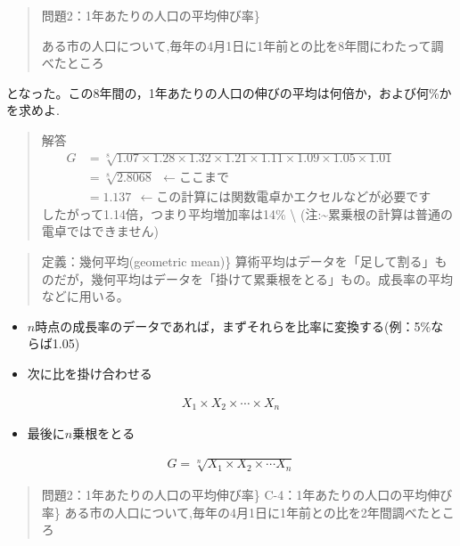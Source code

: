 \documentclass[
]{book}
\providecommand{\tightlist}{%
  \setlength{\itemsep}{0pt}\setlength{\parskip}{0pt}}
\theoremstyle{definition}
\theoremstyle{definition}
\theoremstyle{definition}
\theoremstyle{definition}
\theoremstyle{remark}
\begin{document}
\begin{quote}
問題2：1年あたりの人口の平均伸び率\}

ある市の人口について,毎年の4月1日に1年前との比を8年間にわたって調べたところ
\end{quote}

となった。この8年間の，1年あたりの人口の伸びの平均は何倍か，および何\%かを求めよ.

\begin{quote}
解答
\begin{align*}
G
&=\sqrt[8]{1.07 \times 1.28 \times 1.32 \times 1.21 \times 1.11 \times 1.09 \times 1.05 \times 1.01} \\
&=\sqrt[8]{2.8068}~~\leftarrow \text{ここまで} \\
&=1.137~~\leftarrow \text{この計算には関数電卓かエクセルなどが必要です} 
\end{align*}
したがって1.14倍，つまり平均増加率は14\% \textbackslash{}
(注:\textasciitilde 累乗根の計算は普通の電卓ではできません)
\end{quote}

\begin{quote}
定義：幾何平均(geometric mean)\}
算術平均はデータを「足して割る」ものだが，幾何平均はデータを「掛けて累乗根をとる」もの。成長率の平均などに用いる。
\end{quote}

\begin{itemize}
\tightlist
\item
  \(n\)時点の成長率のデータであれば，まずそれらを比率に変換する(例：5\%ならば1.05)
\item
  次に比を掛け合わせる
\end{itemize}

\begin{align*}
X_1 \times X_2 \times \cdots \times X_n
\end{align*}

\begin{itemize}
\tightlist
\item
  最後に\(n\)乗根をとる
\end{itemize}

\begin{align*}
G=\sqrt[n]{X_1 \times X_2 \times \cdots X_n}
\end{align*}

\begin{quote}
問題2：1年あたりの人口の平均伸び率\}
C-4：1年あたりの人口の平均伸び率\}
ある市の人口について,毎年の4月1日に1年前との比を2年間調べたところ
\end{quote}
\end{document}
